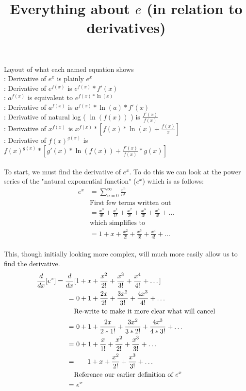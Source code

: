 \documentclass{article}
\title{\vspace{-5ex}Everything about $e$ (in relation to derivatives) \vspace{-5ex}}
\author{}
\date{}
\newcommand{\ddx}{\frac{d}{dx}}
\begin{document}
	\maketitle{}
	\noindent Layout of what each named equation shows \\
	: Derivative of $e^x$ is plainly $e^x$ \\
	: Derivative of $e^{f(x)}$ is $e^{f(x)} * f'(x)$ \\
	: $a^{f(x)}$ is equivalent to $e^{f(x)*\ln(x)}$ \\
	: Derivative of $a^{f(x)}$ is $a^{f(x)} * \ln(a) * f'(x)$ \\
	: Derivative of natural log ( $\ln(f(x))$ ) is $\frac{f'(x)}{f(x)}$ \\
	: Derivative of $x^{f(x)}$ is $x^{f(x)} * [f(x)*\ln(x) + \frac{f(x)}{x}]$ \\
	: Derivative of $f(x)^{g(x)}$ is $f(x)^{g(x)} * [g'(x)*\ln(f(x)) + \frac{f'(x)}{f(x)}*g(x)]$ \\ \\
	To start, we must find the derivative of $e^x$. To do this we can look at the power series of the "natural exponential function" ($e^x$) which is as follows:
	\begin{align*}
		e^x
		&= \sum_{n=0}^\infty \frac{x^n}{n!} \\
		&\text{First few terms written out} \\
		&= \frac{x^0}{0!} + \frac{x^1}{1!} + \frac{x^2}{2!} + \frac{x^3}{3!} + \frac{x^4}{4!} + \dots \\
		&\text{which simplifies to} \\
		&= 1 + x + \frac{x^2}{2!} + \frac{x^3}{3!} + \frac{x^4}{4!} + \dots
	\end{align*}
\\
This, though initially looking more complex, will much more easily allow us to find the derivative.
	\begin{align*}
		\ddx[e^x] = \ddx&[1 + x + \frac{x^2}{2!} + \frac{x^3}{3!} + \frac{x^4}{4!} + \dots] \\
		=&\text{ }0 + 1 + \frac{2x}{2!} + \frac{3x^2}{3!} + \frac{4x^3}{4!} + \dots \\
		&\text{Re-write to make it more clear what will cancel} \\
		=&\text{ }0 + 1 + \frac{2x}{2*1!} + \frac{3x^2}{3*2!} + \frac{4x^3}{4*3!} + \dots \\
		=&\text{ }0 + 1 + \frac{x}{1!} + \frac{x^2}{2!} + \frac{x^3}{3!} + \dots \\
		=&\text{\quad\quad}1 + x + \frac{x^2}{2!} + \frac{x^3}{3!}+\dots \\
		&\text{Reference our earlier definition of $e^x$} \\
		=&\text{ }e^x
	\end{align*}
\end{document}
